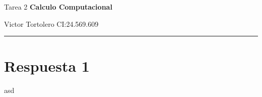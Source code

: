 \documentclass{article}
\begin{document}
\flushleft
\setlength{\parindent}{20pt}

\justify
\centerline{\huge Tarea 2 \textbf{Calculo Computacional}}
\centerline{Victor Tortolero CI:24.569.609}  %
\vspace{0.1cm}
\hrule

\section*{Respuesta 1}
asd






\end{document}
